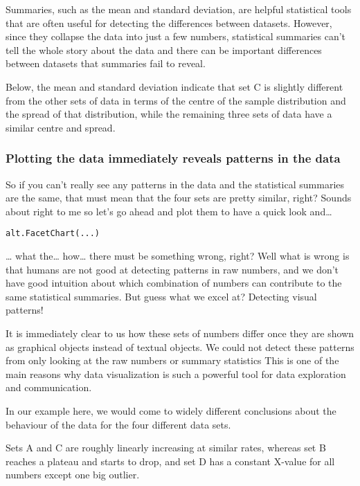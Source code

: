 \documentclass[
  letterpaper,
  DIV=11,
  numbers=noendperiod]{scrreprt}
\begin{document}
Summaries, such as the mean and standard deviation, are helpful
statistical tools that are often useful for detecting the differences
between datasets. However, since they collapse the data into just a few
numbers, statistical summaries can't tell the whole story about the data
and there can be important differences between datasets that summaries
fail to reveal.

Below, the mean and standard deviation indicate that set C is slightly
different from the other sets of data in terms of the centre of the
sample distribution and the spread of that distribution, while the
remaining three sets of data have a similar centre and spread.

\subsubsection{Plotting the data immediately reveals patterns in the
data}\label{plotting-the-data-immediately-reveals-patterns-in-the-data}

So if you can't really see any patterns in the data and the statistical
summaries are the same, that must mean that the four sets are pretty
similar, right? Sounds about right to me so let's go ahead and plot them
to have a quick look and\ldots{}

\begin{verbatim}
alt.FacetChart(...)
\end{verbatim}

\ldots{} what the\ldots{} how\ldots{} there must be something wrong,
right? Well what is wrong is that humans are not good at detecting
patterns in raw numbers, and we don't have good intuition about which
combination of numbers can contribute to the same statistical summaries.
But guess what we excel at? Detecting visual patterns!

It is immediately clear to us how these sets of numbers differ once they
are shown as graphical objects instead of textual objects. We could not
detect these patterns from only looking at the raw numbers or summary
statistics This is one of the main reasons why data visualization is
such a powerful tool for data exploration and communication.

In our example here, we would come to widely different conclusions about
the behaviour of the data for the four different data sets.

Sets A and C are roughly linearly increasing at similar rates, whereas
set B reaches a plateau and starts to drop, and set D has a constant
X-value for all numbers except one big outlier.
\end{document}
